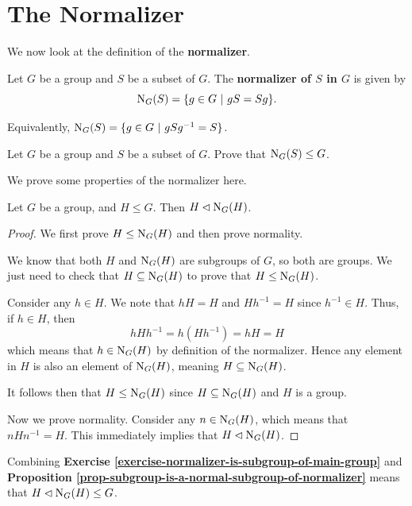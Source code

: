 \newpage

\section{The Normalizer}
We now look at the definition of the \textbf{normalizer}.
\begin{definition}
    Let $G$ be a group and $S$ be a subset of $G$. The \textbf{normalizer of $S$ in $G$} is given by
    \[
        \mathrm{N}_{G}(S) = \{g \in G \ | \  gS = Sg \}.
    \]
\end{definition}
\begin{remark}
    Equivalently, $\mathrm{N}_{G}(S) = \{g \in G \ | \  gSg^{-1} = S \}$.
\end{remark}
\begin{exercise}\label{exercise-normalizer-is-subgroup-of-main-group}
    Let $G$ be a group and $S$ be a subset of $G$. Prove that $\mathrm{N}_{G}(S) \leq G$.
\end{exercise}

We prove some properties of the normalizer here.
\begin{proposition}\label{prop-subgroup-is-a-normal-subgroup-of-normalizer}
    Let $G$ be a group, and $H \leq G$. Then $H \lhd \mathrm{N}_{G}(H)$.
\end{proposition}
\begin{proof}
    We first prove $H \leq \mathrm{N}_{G}(H)$ and then prove normality.

    We know that both $H$ and $\mathrm{N}_{G}(H)$ are subgroups of $G$, so both are groups. We just need to check that $H \subseteq \mathrm{N}_{G}(H)$ to prove that $H \leq \mathrm{N}_{G}(H)$.

    Consider any $h \in H$. We note that $hH = H$ and $Hh^{-1} = H$ since $h^{-1} \in H$. Thus, if $h \in H$, then
    \[
        hHh^{-1} = h(Hh^{-1}) = hH = H
    \]
    which means that $h \in \mathrm{N}_{G}(H)$ by definition of the normalizer. Hence any element in $H$ is also an element of $\mathrm{N}_{G}(H)$, meaning $H \subseteq \mathrm{N}_{G}(H)$.

    It follows then that $H \leq \mathrm{N}_{G}(H)$ since $H \subseteq \mathrm{N}_{G}(H)$ and $H$ is a group.

    Now we prove normality. Consider any $n \in \mathrm{N}_{G}(H)$, which means that $nHn^{-1} = H$. This immediately implies that $H \lhd \mathrm{N}_{G}(H)$.
\end{proof}
\begin{remark}
    Combining \textbf{Exercise \ref{exercise-normalizer-is-subgroup-of-main-group}} and \textbf{Proposition \ref{prop-subgroup-is-a-normal-subgroup-of-normalizer}} means that $H \lhd \mathrm{N}_{G}(H) \leq G$.
\end{remark}

